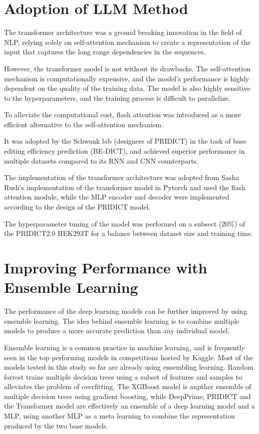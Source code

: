 \section{Adoption of LLM Method}

The transformer architecture was a ground breaking innovation in the field of NLP, relying solely on self-attention mechanism to create a representation of the input that captures the long range dependencies in the sequences. 

However, the transformer model is not without its drawbacks. The self-attention mechanism is computationally expensive, and the model's performance is highly dependent on the quality of the training data. The model is also highly sensitive to the hyperparameters, and the training process is difficult to parallelize. 

To alleviate the computational cost, flash attention was introduced as a more efficient alternative to the self-attention mechanism. 

It was adopted by the Schwank lab (designers of PRIDICT) in the task of base editing efficiency prediction (BE-DICT), and achieved superior performance in multiple datasets compared to its RNN and CNN counterparts\cite{marquartPredictingBaseEditing2021}.

The implementation of the transformer architecture was adopted from Sasha Rush's implementation of the transformer model in Pytorch\cite{AnnotatedTransformer} and used the flash attention module, while the MLP encoder and decoder were implemented according to the design of the PRIDICT model.

The hyperparameter tuning of the model was performed on a subsect (20\%) of the PRIDICT2.0 HEK293T for a balance between dataset size and training time.

\section{Improving Performance with Ensemble Learning}

The performance of the deep learning models can be further improved by using ensemble learning. The idea behind ensemble learning is to combine multiple models to produce a more accurate prediction than any individual model. 

Ensemble learning is a common practice in machine learning, and is frequently seen in the top performing models in competitions hosted by Kaggle.
Most of the models tested in this study so far are already using ensembling learning. Random forrest trains multiple decision trees using a subset of features and samples to alleviates the problem of overfitting. The XGBoost model is anpther ensemble of multiple decision trees using gradient boosting, while DeepPrime, PRIDICT and the Transformer model are effectively an ensemble of a deep learning model and a MLP, using another MLP as a meta learning to combine the representation produced by the two base models.

